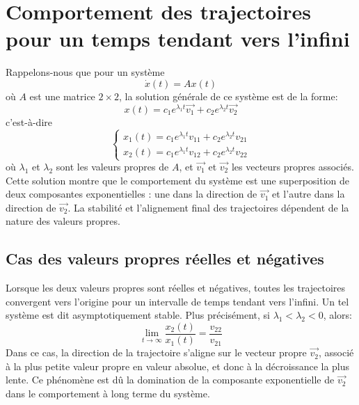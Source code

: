     \section{Comportement des trajectoires pour un temps tendant vers l'infini}
        Rappelons-nous que pour un système
        \begin{equation}
            \dot{x}(t) = A x(t)
        \end{equation}
        où $A$ est une matrice $2 \times 2$, la solution générale de ce système est de la forme:
        \begin{equation}
            x(t) = c_1 e^{\lambda_1 t} \overrightarrow{v_1} + c_2 e^{\lambda_2 t} \overrightarrow{v_2}
        \end{equation}
        c'est-à-dire
        \begin{equation}
            \begin{cases}
                x_1(t) = c_1 e^{\lambda_1 t} v_{11} + c_2 e^{\lambda_2 t} v_{21} \\
                x_2(t) = c_1 e^{\lambda_1 t} v_{12} + c_2 e^{\lambda_2 t} v_{22}
            \end{cases}
        \end{equation}
        où $\lambda_1$ et $\lambda_2$ sont les valeurs propres de $A$, et $\overrightarrow{v_1}$ et $\overrightarrow{v_2}$ les vecteurs propres associés. Cette solution montre que le comportement du système est une superposition de deux composantes exponentielles : une dans la direction de $\overrightarrow{v_1}$ et l'autre dans la direction de $\overrightarrow{v_2}$. La stabilité et l’alignement final des trajectoires dépendent de la nature des valeurs propres.

        \subsection{Cas des valeurs propres réelles et négatives}
            Lorsque les deux valeurs propres sont réelles et négatives, toutes les trajectoires convergent vers l'origine pour un intervalle de temps tendant vers l'infini. Un tel système est dit asymptotiquement stable. Plus précisément, si $\lambda_1 < \lambda_2 < 0$, alors:
            \begin{equation}
                \lim_{t \to \infty} \frac{x_2(t)}{x_1(t)} = \frac{v_{22}}{v_{21}}
            \end{equation}
            Dans ce cas, la direction de la trajectoire s'aligne sur le vecteur propre $ \overrightarrow{v_2}$, associé à la plus petite valeur propre en valeur absolue, et donc à la décroissance la plus lente. Ce phénomène est dû la domination de la composante exponentielle de $\overrightarrow{v_2}$ dans le comportement à long terme du système.

